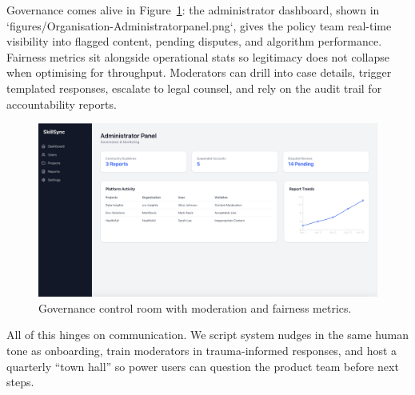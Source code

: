 Governance comes alive in Figure~\ref{fig:admin-panel}: the administrator dashboard, shown in `figures/Organisation-Administratorpanel.png`, gives the policy team real-time visibility into flagged content, pending disputes, and algorithm performance. Fairness metrics sit alongside operational stats so legitimacy does not collapse when optimising for throughput. Moderators can drill into case details, trigger templated responses, escalate to legal counsel, and rely on the audit trail for accountability reports.

\begin{figure}[H]
  \centering
  \includegraphics[width=0.85\linewidth]{figures/Organisation-Administratorpanel.png}
  \caption{Governance control room with moderation and fairness metrics.}
  \label{fig:admin-panel}
\end{figure}

All of this hinges on communication. We script system nudges in the same human tone as onboarding, train moderators in trauma-informed responses, and host a quarterly ``town hall'' so power users can question the product team before next steps.
